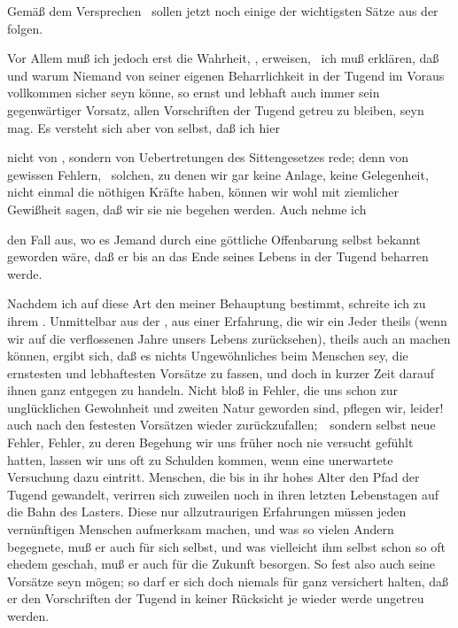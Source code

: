 Gemäß dem Versprechen \ sollen jetzt noch einige der wichtigsten Sätze aus der  folgen.
\begin{aufza}
\item Vor Allem muß ich jedoch erst die Wahrheit, , erweisen, \dh\ ich muß erklären, daß und warum Niemand von seiner eigenen Beharrlichkeit in der Tugend im Voraus vollkommen sicher seyn könne, so ernst und lebhaft auch immer sein gegenwärtiger Vorsatz, allen Vorschriften der Tugend getreu zu bleiben, seyn mag. Es versteht sich aber von selbst, daß ich hier
\begin{aufzb}
\item nicht von , sondern von Uebertretungen des Sittengesetzes  rede; denn von gewissen Fehlern, \zB\ solchen, zu denen wir gar keine Anlage, keine Gelegenheit, nicht einmal die nöthigen Kräfte haben, können wir wohl mit ziemlicher Gewißheit sagen, daß wir sie nie begehen werden. Auch nehme ich
\item den Fall aus, wo es Jemand durch eine göttliche Offenbarung selbst bekannt geworden wäre, daß er bis an das Ende seines Lebens in der Tugend beharren werde.
\end{aufzb}
\item Nachdem ich auf diese Art den  meiner Behauptung bestimmt, schreite ich zu ihrem . Unmittelbar aus der , aus einer Erfahrung, die wir ein Jeder theils  (wenn wir auf die verflossenen Jahre unsers Lebens zurücksehen), theils auch an  machen können, ergibt sich, daß es nichts Ungewöhnliches beim Menschen sey, die ernstesten und lebhaftesten Vorsätze zu fassen, und doch in kurzer Zeit darauf ihnen ganz entgegen zu handeln. Nicht bloß in Fehler, die uns schon zur unglücklichen Gewohnheit und zweiten Natur geworden sind, pflegen wir, leider! auch nach den festesten Vorsätzen wieder zurückzufallen;~\ sondern selbst neue Fehler, Fehler, zu deren Begehung wir uns früher noch nie versucht gefühlt hatten, lassen wir uns oft zu Schulden kommen, wenn eine unerwartete Versuchung dazu eintritt. Menschen, die bis in ihr hohes Alter den Pfad der Tugend gewandelt, verirren sich zuweilen noch in ihren letzten Lebenstagen auf die Bahn des Lasters. Diese nur allzutraurigen Erfahrungen müssen jeden vernünftigen Menschen aufmerksam machen, und was so vielen Andern begegnete, muß er auch für sich selbst, und was vielleicht ihm selbst schon so oft ehedem geschah, muß er auch für die Zukunft besorgen. So fest also auch seine Vorsätze seyn mögen; so darf er sich doch niemals für ganz versichert halten, daß er den Vorschriften der Tugend in keiner Rücksicht je wieder werde ungetreu werden.
\end{aufza}

